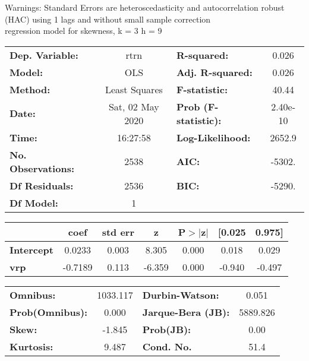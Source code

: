 Warnings: \newline
 [1] Standard Errors are heteroscedasticity and autocorrelation robust (HAC) using 1 lags and without small sample correction\\ 

regression model for skewness, k = 3 h = 9\begin{center}
\begin{tabular}{lclc}
\toprule
\textbf{Dep. Variable:}    &       rtrn       & \textbf{  R-squared:         } &     0.026   \\
\textbf{Model:}            &       OLS        & \textbf{  Adj. R-squared:    } &     0.026   \\
\textbf{Method:}           &  Least Squares   & \textbf{  F-statistic:       } &     40.44   \\
\textbf{Date:}             & Sat, 02 May 2020 & \textbf{  Prob (F-statistic):} &  2.40e-10   \\
\textbf{Time:}             &     16:27:58     & \textbf{  Log-Likelihood:    } &    2652.9   \\
\textbf{No. Observations:} &        2538      & \textbf{  AIC:               } &    -5302.   \\
\textbf{Df Residuals:}     &        2536      & \textbf{  BIC:               } &    -5290.   \\
\textbf{Df Model:}         &           1      & \textbf{                     } &             \\
\bottomrule
\end{tabular}
\begin{tabular}{lcccccc}
                   & \textbf{coef} & \textbf{std err} & \textbf{z} & \textbf{P$> |$z$|$} & \textbf{[0.025} & \textbf{0.975]}  \\
\midrule
\textbf{Intercept} &       0.0233  &        0.003     &     8.305  &         0.000        &        0.018    &        0.029     \\
\textbf{vrp}       &      -0.7189  &        0.113     &    -6.359  &         0.000        &       -0.940    &       -0.497     \\
\bottomrule
\end{tabular}
\begin{tabular}{lclc}
\textbf{Omnibus:}       & 1033.117 & \textbf{  Durbin-Watson:     } &    0.051  \\
\textbf{Prob(Omnibus):} &   0.000  & \textbf{  Jarque-Bera (JB):  } & 5889.826  \\
\textbf{Skew:}          &  -1.845  & \textbf{  Prob(JB):          } &     0.00  \\
\textbf{Kurtosis:}      &   9.487  & \textbf{  Cond. No.          } &     51.4  \\
\bottomrule
\end{tabular}
\end{center}

